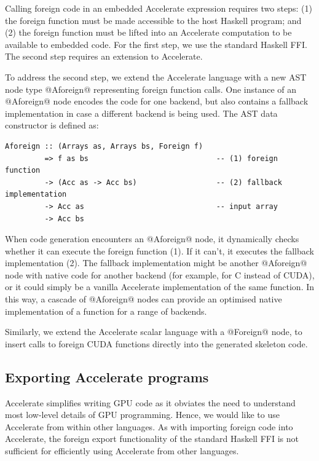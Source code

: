 Calling foreign code in an embedded Accelerate expression requires two steps:
(1) the foreign function must be made accessible to the host Haskell program;
and (2) the foreign function must be lifted into an Accelerate computation to be
available to embedded code. For the first step, we use the standard Haskell FFI.
The second step requires an extension to Accelerate.

To address the second step, we extend the Accelerate language with a new AST
node type @Aforeign@ representing foreign function calls. One instance of an
@Aforeign@ node encodes the code for one backend, but also contains a fallback
implementation in case a different backend is being used. The AST data
constructor is defined as:
%
\begin{lstlisting}[style=haskell]
Aforeign :: (Arrays as, Arrays bs, Foreign f)
         => f as bs                             -- (1) foreign function
         -> (Acc as -> Acc bs)                  -- (2) fallback implementation
         -> Acc as                              -- input array
         -> Acc bs
\end{lstlisting}
%
When code generation encounters an @Aforeign@ node, it dynamically checks
whether it can execute the foreign function (1). If it can't, it executes the
fallback implementation (2). The fallback implementation might be another @Aforeign@
node with native code for another backend (for example, for C instead of CUDA),
or it could simply be a vanilla Accelerate implementation of the same function.
In this way, a cascade of @Aforeign@ nodes can provide an optimised native
implementation of a function for a range of backends.

Similarly, we extend the Accelerate scalar language with a @Foreign@ node, to
insert calls to foreign CUDA functions directly into the generated skeleton
code.


\subsection{Exporting Accelerate programs}

Accelerate simplifies writing GPU code as it obviates the need to understand
most low-level details of GPU programming. Hence, we would like to use
Accelerate from within other languages. As with importing foreign code into
Accelerate, the foreign export functionality of the standard Haskell FFI is not
sufficient for efficiently using Accelerate from other languages.

